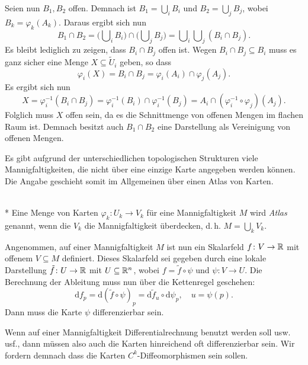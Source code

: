Seien nun $B_1,B_2$ offen. Demnach ist $B_1=\bigcup_i B_i$
und $B_2=\bigcup_j B_j$, wobei $B_k=\varphi_k(A_k)$.
Daraus ergibt sich nun
\begin{equation}
B_1\cap B_2 = \Big(\bigcup\nolimits_i B_i\Big)
\cap\Big(\bigcup\nolimits_j B_j\Big)
= \bigcup\nolimits_i \bigcup\nolimits_j (B_i\cap B_j).
\end{equation}
Es bleibt lediglich zu zeigen, dass $B_i\cap B_j$ offen ist.
Wegen $B_i\cap B_j\subseteq B_i$ muss es ganz sicher eine Menge
$X\subseteq\tilde U_i$ geben, so dass
\begin{equation}
\varphi_i(X) = B_i\cap B_j = \varphi_i(A_i)\cap\varphi_j(A_j).
\end{equation}
Es ergibt sich nun
\begin{equation}
X = \varphi_i^{-1}(B_i\cap B_j)
= \varphi_i^{-1}(B_i)\cap\varphi_i^{-1}(B_j)
= A_i\cap (\varphi_i^{-1}{\circ}\varphi_j)(A_j).
\end{equation}
Folglich muss $X$ offen sein, da es die Schnittmenge von offenen
Mengen im flachen Raum ist. Demnach besitzt auch $B_1\cap B_2$
eine Darstellung als Vereinigung von offenen Mengen.\;\qedsymbol

Es gibt aufgrund der unterschiedlichen topologischen Strukturen
viele Mannigfaltigkeiten, die nicht über eine einzige Karte
angegeben werden können. Die Angabe geschieht somit im
Allgemeinen über einen Atlas von Karten.

\begin{definition}[Atlas]\mbox{}\\*
Eine Menge von Karten $\varphi_k\colon U_k\to V_k$ für eine
Mannigfaltigkeit $M$ wird \emph{Atlas} genannt, wenn die
$V_k$ die Mannigfaltigkeit überdecken, d.\,h. $M=\bigcup_k V_k$.
\end{definition}

\noindent
Angenommen, auf einer Mannigfaltigkeit $M$ ist nun ein Skalarfeld
$f\colon V\to\mathbb R$ mit offenem $V\subseteq M$ definiert. Dieses
Skalarfeld sei gegeben durch eine lokale Darstellung
$\tilde f\colon U\to\mathbb R$ mit $U\subseteq\mathbb R^n$, wobei
$f=\tilde f\circ\psi$ und $\psi\colon V\to U$.
Die Berechnung der Ableitung muss nun über die Kettenregel
geschehen:
\begin{equation}
\mathrm df_p = \mathrm d(\tilde f\circ\psi)_p
= \mathrm d\tilde f_u\circ\mathrm d\psi_p,
\quad u = \psi(p).
\end{equation}
Dann muss die Karte $\psi$ differenzierbar sein.

Wenn auf einer Mannigfaltigkeit Differentialrechnung benutzt
werden soll usw. usf., dann müssen also auch die Karten hinreichend oft
differenzierbar sein. Wir fordern demnach dass die Karten
$C^k$-Diffeomorphismen sein sollen.


